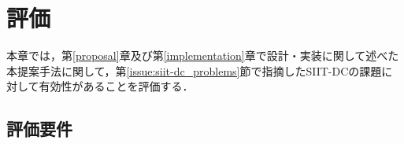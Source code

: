 \chapter{評価}
\label{evaluation}
本章では，第\ref{proposal}章及び第\ref{implementation}章で設計・実装に関して述べた本提案手法に関して，第\ref{issue:siit-dc_problems}節で指摘したSIIT-DCの課題に対して有効性があることを評価する．


\section{評価要件}







